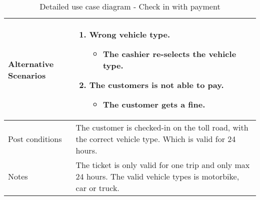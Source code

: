\begin{table}[H]
\begin{tabular}{| p{3cm}| p{11.5cm}|}
        Alternative Scenarios     & 
        
        \renewcommand{\labelenumi}{\Roman{enumi}:}
        \renewcommand{\labelenumii}{\alph{enumii})}
        
        \begin{enumerate}[a:, topsep=0.0cm,leftmargin=0.5cm]
            \item Wrong vehicle type.
        	\begin{itemize}[topsep=0cm, leftmargin=1cm]
        	    \item The cashier re-selects the vehicle type.
        	\end{itemize}
        	\item The customers is not able to pay.
        	\begin{itemize}[topsep=0cm, leftmargin=1cm]
        	    \item The customer gets a fine.
        	\end{itemize}
        \end{enumerate} \\\hline
        
        Post conditions         & The customer is checked-in on the toll road, with the correct vehicle type. Which is valid for 24 hours. \\\hline
        Notes                   & The ticket is only valid for one trip and only max 24 hours. The valid vehicle types is motorbike, car or truck. \\\hline
        
    \end{tabular}
    \caption{Detailed use case diagram - Check in with payment}
    \label{tab:UC1}
\end{table}